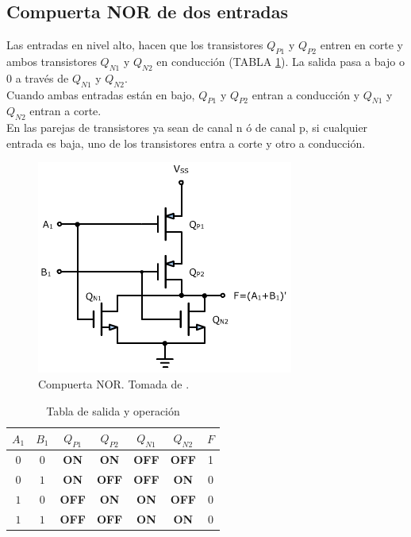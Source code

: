 \documentclass[twocolumn]{IEEEtran}
\begin{document}
\subsection{Compuerta NOR de dos entradas}
\noindent
Las entradas en nivel alto, hacen que los transistores $Q_{P1}$ y $Q_{P2}$ entren en corte y ambos transistores $Q_{N1}$ y $Q_{N2}$ en conducción (TABLA \ref{tab2}). La salida pasa a bajo o $0$ a través de $Q_{N1}$ y $Q_{N2}$.\\
Cuando ambas entradas están en bajo, $Q_{P1}$ y $Q_{P2}$ entran a conducción y $Q_{N1}$ y $Q_{N2}$ entran a corte.\\
En las parejas de transistores ya sean de canal n ó de canal p, si cualquier entrada es baja, uno de los transistores entra a corte y otro a conducción.
\begin{figure}[H]
  \centering
    \includegraphics[scale=0.5]{fig2.png}
      \caption{Compuerta NOR. Tomada de \cite{page1}.}
	\label{fig2}
\end{figure}
\begin{table}[H]
  \caption{Tabla de salida y operación}
    \centering
      \begin{tabular}{|c|c|c|c|c|c|c|}\hline
      $A_1$ & $B_1$ & $Q_{P1}$ & $Q_{P2}$ & $Q_{N1}$ & $Q_{N2}$ & $F$ \\ \hline
      $0$ & $0$ & \bf ON & \bf ON & \bf OFF & \bf OFF & 1 \\ \hline
      $0$ & $1$ & \bf ON & \bf OFF & \bf OFF & \bf ON & 0 \\ \hline
      $1$ & $0$ & \bf OFF & \bf ON & \bf ON & \bf OFF & 0 \\ \hline
      $1$ & $1$ & \bf OFF & \bf OFF & \bf ON & \bf ON & 0 \\ \hline
      \end{tabular}
  \label{tab2}
\end{table}
\end{document}
